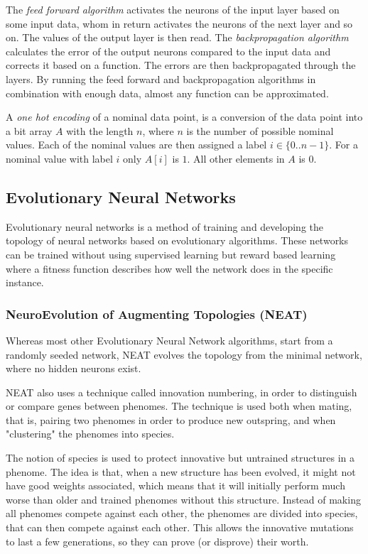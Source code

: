 \newpar The \textit{feed forward algorithm} activates the neurons of the input layer based on some input data, whom in return activates the neurons of the next layer and so on. The values of the output layer is then read. The \textit{backpropagation algorithm} calculates the error of the output neurons compared to the input data and corrects it based on a function. The errors are then backpropagated through the layers. By running the feed forward and backpropagation algorithms in combination with enough data, almost any function can be approximated.

\newpar A \textit{one hot encoding} of a nominal data point, is a conversion of the data point into a bit array $A$ with the length $n$, where $n$ is the number of possible nominal values. Each of the nominal values are then assigned a label $i \in \{0 .. n-1\}$. For a nominal value with label $i$ only $ A[i] $ is $1$. All other elements in $A$ is $0$.

\subsection{Evolutionary Neural Networks}
Evolutionary neural networks is a method of training and developing the topology of neural networks based on evolutionary algorithms. These networks can be trained without using supervised learning but reward based learning where a fitness function describes how well the network does in the specific instance. 

\subsubsection{NeuroEvolution of Augmenting Topologies (NEAT)}
Whereas most other Evolutionary Neural Network algorithms, start from a randomly seeded network, NEAT evolves the topology from the minimal network, where no hidden neurons exist.

\newpar NEAT also uses a technique called innovation numbering, in order to distinguish or compare genes between phenomes. The technique is used both when mating, that is, pairing two phenomes in order to produce new outspring, and when "clustering" the phenomes into species.

\newpar The notion of species is used to protect innovative but untrained structures in a phenome. The idea is that, when a new structure has been evolved, it might not have good weights associated, which means that it will initially perform much worse than older and trained phenomes without this structure. Instead of making all phenomes compete against each other, the phenomes are divided into species, that can then compete against each other. This allows the innovative mutations to last a few generations, so they can prove (or disprove) their worth.

